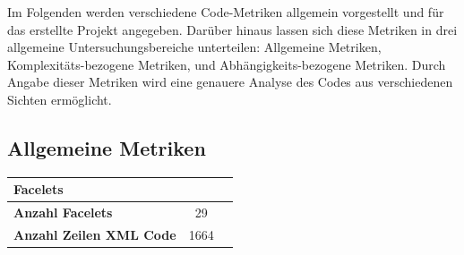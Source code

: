 \documentclass{article}
\begin{document}
Im Folgenden werden verschiedene Code-Metriken allgemein vorgestellt und für das erstellte Projekt angegeben. 
Darüber hinaus lassen sich diese Metriken in drei allgemeine Untersuchungsbereiche unterteilen: 
Allgemeine Metriken, Komplexitäts-bezogene Metriken, und Abhängigkeits-bezogene Metriken.
Durch Angabe dieser Metriken wird eine genauere Analyse des Codes aus verschiedenen Sichten ermöglicht.

\subsection{Allgemeine Metriken}

\begin{longtable}{@{\extracolsep{\fill}}lcl@{}}
\toprule
\multicolumn{2}{l}{\textbf{Facelets}} \\* \midrule
\endfirsthead
\endhead
\textbf{Anzahl Facelets} & 29 \\
\textbf{Anzahl Zeilen XML Code} & 1664 \\* \bottomrule
\end{longtable}
\end{document}
